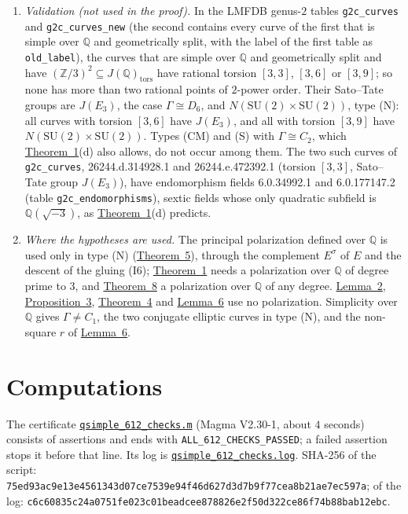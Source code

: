 \documentclass[11pt]{article}
\newcommand{\Q}{\mathbb Q}
\newcommand{\Z}{\mathbb Z}
\begin{document}
\begin{enumerate}
\item\label{rem-lmfdb} \emph{Validation (not used in the proof).} In the LMFDB genus-\(2\) tables
\texttt{g2c\_curves} and \texttt{g2c\_curves\_new} \cite{LMFDB} (the second contains every curve of the first that
is simple over \(\Q\) and geometrically split, with the label of the first table as \texttt{old\_label}), the curves
that are simple over \(\Q\) and geometrically split and have \((\Z/3)^2\subseteq J(\Q)_{\mathrm{tors}}\) have
rational torsion \([3,3]\), \([3,6]\) or \([3,9]\); so none has more than two rational points of \(2\)-power order.
Their Sato--Tate groups are \(J(E_3)\), the case \(\Gamma\cong D_6\), and \(N(\mathrm{SU}(2)\times\mathrm{SU}(2))\),
type (N): all curves with torsion \([3,6]\) have \(J(E_3)\), and all with torsion \([3,9]\) have
\(N(\mathrm{SU}(2)\times\mathrm{SU}(2))\). Types (CM) and (S) with \(\Gamma\cong C_2\), which
\hyperref[thm-full3]{Theorem~1}(d) also allows, do not occur among them. The two such curves of
\texttt{g2c\_curves}, 26244.d.314928.1 and 26244.e.472392.1 (torsion \([3,3]\), Sato--Tate group \(J(E_3)\)), have
endomorphism fields 6.0.34992.1 and 6.0.177147.2 (table \texttt{g2c\_endomorphisms}), sextic fields whose only
quadratic subfield is \(\Q(\sqrt{-3})\), as \hyperref[thm-full3]{Theorem~1}(d) predicts.

\item\label{rem-where} \emph{Where the hypotheses are used.} The principal polarization defined over \(\Q\) is used
only in type (N) (\hyperref[thm-N]{Theorem~5}), through the complement \(E^\sigma\) of \(E\) and the descent of the
gluing (I6); \hyperref[thm-full3]{Theorem~1} needs a polarization over \(\Q\) of degree prime to \(3\), and
\hyperref[thm-inertia]{Theorem~8} a polarization over \(\Q\) of any degree. \hyperref[lemma-shapes]{Lemma~2},
\hyperref[prop-ord3]{Proposition~3}, \hyperref[thm-cm]{Theorem~4} and \hyperref[lemma-rm]{Lemma~6} use no
polarization. Simplicity over \(\Q\) gives \(\Gamma\neq C_1\), the two conjugate elliptic curves in type (N), and
the non-square \(r\) of \hyperref[lemma-rm]{Lemma~6}.
\end{enumerate}

\section{Computations}\label{computations}

The certificate
\href{https://genus-2-torsion.github.io/data/knowledge/sources/qsimple_612_checks.m}{\texttt{qsimple\_612\_checks.m}}
(Magma V2.30-1, about \(4\) seconds) consists of assertions and ends with \texttt{ALL\_612\_CHECKS\_PASSED}; a
failed assertion stops it before that line. Its log is
\href{https://genus-2-torsion.github.io/data/knowledge/sources/qsimple_612_checks.log}{\texttt{qsimple\_612\_checks.log}}.
SHA-256 of the script:
\texttt{75ed93ac9e13e456\allowbreak 1343d07ce7539e94\allowbreak f46d627d3d7b9f77\allowbreak cea8b21ae7ec597a};
of the log:
\texttt{c6c60835c24a0751\allowbreak fe023c01beadcee8\allowbreak 78826e2f50d322ce\allowbreak 86f74b88bab12ebc}.
\end{document}
